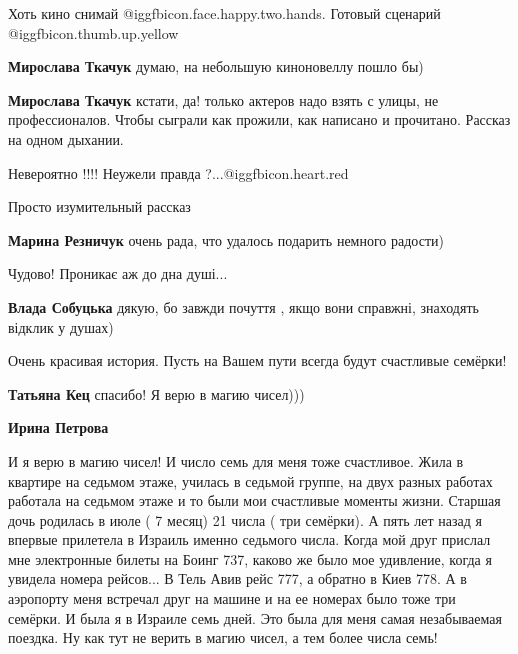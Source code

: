 \begin{itemize}
\begin{itemize}
\end{itemize} %

Хоть кино снимай @igg{fbicon.face.happy.two.hands}. Готовый сценарий  @igg{fbicon.thumb.up.yellow} 

\begin{itemize} %
\textbf{Мирослава Ткачук} думаю, на небольшую киноновеллу пошло бы)

\textbf{Мирослава Ткачук} кстати, да! только актеров надо взять с улицы, не профессионалов. Чтобы сыграли как прожили, как написано и прочитано. Рассказ на одном дыхании.
\end{itemize} %

Невероятно !!!! Неужели правда ?...@igg{fbicon.heart.red}

Просто изумительный рассказ

\begin{itemize} %
\textbf{Марина Резничук} очень рада, что удалось подарить немного радости)
\end{itemize} %

Чудово! Проникає аж до дна душі...

\begin{itemize} %
\textbf{Влада Собуцька} дякую, бо завжди почуття , якщо вони справжні, знаходять відклик у душах)
\end{itemize} %

Очень красивая история. Пусть на Вашем пути всегда будут счастливые семёрки!

\begin{itemize} %
\textbf{Татьяна Кец} спасибо! Я верю в магию чисел)))

\textbf{Ирина Петрова} 

И я верю в магию чисел! И число семь для меня тоже счастливое. Жила в квартире
на седьмом этаже, училась в седьмой группе, на двух разных работах работала на
седьмом этаже и то были мои счастливые моменты жизни. Старшая дочь родилась в
июле ( 7 месяц) 21 числа ( три семёрки). А пять лет назад я впервые прилетела в
Израиль именно седьмого числа. Когда мой друг прислал мне электронные билеты на
Боинг 737, каково же было мое удивление, когда я увидела номера рейсов... В
Тель Авив рейс 777, а обратно в Киев 778. А в аэропорту меня встречал друг на
машине и на ее номерах было тоже три семёрки. И была я в Израиле семь дней. Это
была для меня самая незабываемая поездка. Ну как тут не верить в магию чисел, а
тем более числа семь!


\end{itemize}
\end{itemize}
